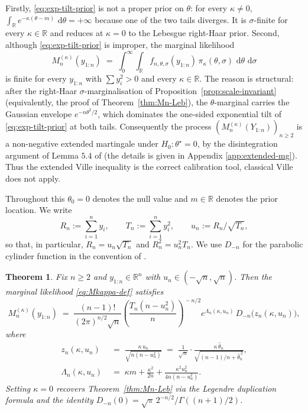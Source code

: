 \documentclass{article}%
\newtheorem{theorem}{Theorem}[section]
\newcommand{\dd}{\,\mathrm{d}}
\newcommand{\1}{\mathbf{1}}
\begin{document}
Firstly, \eqref{eq:exp-tilt-prior} is not a proper prior on $\theta$: for every $\kappa\neq 0$, $\int_\mathbb{R} e^{-\kappa(\theta-m)}\,
\dd\theta=+\infty$ because one of the two tails diverges. It is $\sigma$-finite for every $\kappa\in\mathbb{R}$ and reduces at $\kappa=0$ to the
Lebesgue right-Haar prior. Second, although \eqref{eq:exp-tilt-prior} is improper, the marginal
likelihood
\begin{equation}\label{eq:Mkappa-def}
  M_n^{(\kappa)}(y_{1:n})
  \;=\;\int_0^\infty\!\int_\mathbb{R} f_{n,\theta,\sigma}(y_{1:n})\,
  \pi_\kappa(\theta,\sigma)\,\dd\theta\,\dd\sigma
\end{equation}
is finite for every $y_{1:n}$ with $\sum y_i^2>0$ and every $\kappa\in\mathbb{R}$. The reason is structural: after the right-Haar $\sigma$-marginalisation of Proposition~\ref{prop:scale-invariant} (equivalently, the proof of Theorem~\ref{thm:Mn-Leb}), the $\theta$-marginal carries the Gaussian envelope $e^{-n\theta^2/2}$, which dominates the one-sided exponential
tilt of \eqref{eq:exp-tilt-prior} at both tails. Consequently the
process $(M_n^{(\kappa)}(Y_{1:n}))_{n\geq 2}$ is a non-negative extended martingale under $H_0:\theta^\star=0$, by the disintegration argument of Lemma $5.4$ of \cite{Wang2025} (the details is given in Appendix \ref{app:extended-mg}). Thus the extended Ville inequality is the correct calibration tool, classical Ville does not apply. 

Throughout this $\theta_0=0$ denotes the null value and $m\in\mathbb{R}$ denotes the prior location. We
write
\[
  R_n := \sum_{i=1}^n y_i,\qquad
  T_n := \sum_{i=1}^n y_i^2,\qquad
  u_n := R_n/\sqrt{T_n},
\]
so that, in particular, $R_n=u_n\sqrt{T_n}$ and $R_n^2 = u_n^2 T_n$. We use $D_{-n}$ for the parabolic cylinder function in the convention of
\cite{GradshteynRyzhik2014}.

\begin{theorem}\label{thm:Mn-kappa}
Fix $n\geq 2$ and $y_{1:n}\in\mathbb{R}^n$ with $u_n\in(-\sqrt n,\sqrt n)$.
Then the marginal likelihood \eqref{eq:Mkappa-def} satisfies
\begin{equation}\label{eq:Mn-kappa}
  M_n^{(\kappa)}(y_{1:n})
  \;=\;\frac{(n-1)!}{(2\pi)^{n/2}\sqrt n}
  \left(\frac{T_n(n-u_n^2)}{n}\right)^{\!-n/2}\!
  e^{\Lambda_n(\kappa,u_n)}\,
  D_{-n}\!\bigl(z_n(\kappa,u_n)\bigr),
\end{equation}
where
\begin{align}
  z_n(\kappa,u_n)
  &\;=\;\frac{\kappa\,u_n}{\sqrt{n(n-u_n^2)}}
  \;=\;\frac{1}{\sqrt n}\cdot
  \frac{\kappa\,\widehat\theta_n}{\sqrt{(n-1)/n+\widehat\theta_n^{\,2}}},
  \label{eq:zn}\\[2pt]
  \Lambda_n(\kappa,u_n)
  &\;=\;\kappa m+\frac{\kappa^2}{2n}
  +\frac{\kappa^2 u_n^2}{4n(n-u_n^2)}.
  \label{eq:Lambdan}
\end{align}
Setting $\kappa=0$ recovers Theorem~\ref{thm:Mn-Leb} via the Legendre
duplication formula and the identity
$D_{-n}(0)=\sqrt\pi\,2^{-n/2}/\Gamma((n+1)/2)$.
\end{theorem}
\end{document}
